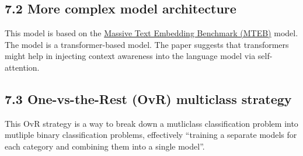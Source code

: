 \subsection*{7.2 More complex model architecture}
This model is based on the \href{https://arxiv.org/pdf/2210.07316.pdf}{Massive Text Embedding Benchmark (MTEB)} model. The model is a transformer-based model. The paper suggests that transformers might help in injecting context awareness into the language model via self-attention.

\subsection*{7.3 One-vs-the-Rest (OvR) multiclass strategy}
This OvR strategy is a way to break down a mutliclass classification problem into mutliple binary classification problems, effectively ``training a separate models for each category and combining them into a single model''.